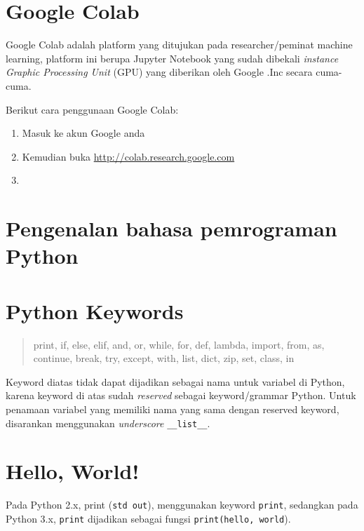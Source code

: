 \section{Google Colab}\label{google-colab}

Google Colab adalah platform yang ditujukan pada researcher/peminat
machine learning, platform ini berupa Jupyter Notebook yang sudah
dibekali \emph{instance Graphic Processing Unit} (GPU) yang diberikan
oleh Google .Inc secara cuma-cuma.

Berikut cara penggunaan Google Colab:

\begin{enumerate}
\def\labelenumi{\alph{enumi}.}
\item
  Masuk ke akun Google anda
\item
  Kemudian buka \url{http://colab.research.google.com}
\item
\end{enumerate}

\section{Pengenalan bahasa pemrograman
Python}\label{pengenalan-bahasa-pemrograman-python}

\section{Python Keywords}\label{python-keywords}

\begin{quote}
print, if, else, elif, and, or, while, for, def, lambda, import, from,
as, continue, break, try, except, with, list, dict, zip, set, class, in
\end{quote}

Keyword diatas tidak dapat dijadikan sebagai nama untuk variabel di
Python, karena keyword di atas sudah \emph{reserved} sebagai
keyword/grammar Python. Untuk penamaan variabel yang memiliki nama yang
sama dengan reserved keyword, disarankan menggunakan \emph{underscore}
\texttt{\_\_list\_\_}.

\section{Hello, World!}\label{hello-world}

Pada Python 2.x, print (\texttt{std\ out}), menggunakan keyword
\texttt{print}, sedangkan pada Python 3.x, \texttt{print} dijadikan
sebagai fungsi \texttt{print(\textquotesingle{}hello,\ world}).

